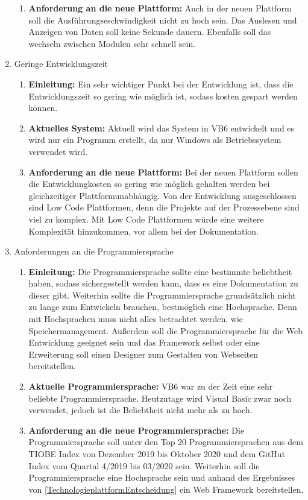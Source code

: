 \documentclass[ngerman]{article}
\begin{document}
\begin{enumerate}
\begin{enumerate}[label=]
            \item \textbf{Anforderung an die neue Plattform:} Auch in der neuen Plattform soll die Ausführungseschwindigkeit nicht zu hoch sein. Das Auslesen und Anzeigen von Daten soll keine Sekunde dauern. Ebenfalls soll das wechseln zwischen Modulen sehr schnell sein.\\
        \end{enumerate}
        \item Geringe Entwicklungszeit
        \begin{enumerate}[label=]
            \item \textbf{Einleitung:} Ein sehr wichtiger Punkt bei der Entwicklung ist, dass die Entwicklungszeit so gering wie möglich ist, sodass kosten gespart werden können.
            \item \textbf{Aktuelles System:} Aktuell wird das System in VB6 entwickelt und es wird nur ein Programm erstellt, da nur Windows als Betriebssystem verwendet wird.
            \item \textbf{Anforderung an die neue Plattform:} Bei der neuen Plattform sollen die Entwicklungkosten so gering wie möglich gehalten werden bei gleichzeitiger Plattformunabhängig. Von der Entwicklung ausgeschlossen sind Low Code Plattformen, denn die Projekte auf der Prozessebene sind viel zu komplex. Mit Low Code Plattformen würde eine weitere Komplexität hinzukommen, vor allem bei der Dokumentation.
        \end{enumerate}
        \item Anforderungen an die Programmiersprache
        \begin{enumerate}[label=]
            \item \textbf{Einleitung:} Die Programmiersprache sollte eine bestimmte beliebtheit haben, sodass sichergestellt werden kann, dass es eine Dokumentation zu dieser gibt. Weiterhin sollte die Programmiersprache grundsätzlich nicht zu lange zum Entwickeln brauchen, bestmöglich eine Hochsprache. Denn mit Hochsprachen muss nicht alles betrachtet werden, wie Speichermanagement. Außerdem soll die Programmiersprache für die Web Entwicklung geeignet sein und das Framework selbst oder eine Erweiterung soll einen Designer zum Gestalten von Webseiten bereitstellen.
            \item \textbf{Aktuelle Programmiersprache:} VB6 war zu der Zeit eine sehr beliebte Programmiersprache. Heutzutage wird Visual Basic zwar noch verwendet, jedoch ist die Beliebtheit nicht mehr als zu hoch.
            \item \textbf{Anforderung an die neue Programmiersprache:} Die Programmiersprache soll unter den Top 20 Programmiersprachen aus dem TIOBE Index von Dezember 2019 bis Oktober 2020 und dem GitHut Index vom Quartal 4/2019 bis 03/2020 sein. Weiterhin soll die Programmiersprache eine Hochsprache sein und anhand des Ergebnisses von \ref{TechnologieplattformEntscheidung} ein Web Framework bereitstellen.

\end{enumerate}
\end{enumerate}
\end{document}
